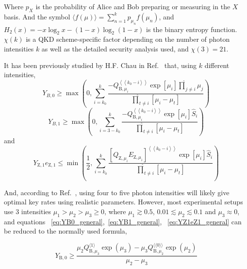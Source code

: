\documentclass[%
 reprint,
superscriptaddress,
 amsmath,amssymb,
 aps,
]{revtex4-2}
\begin{document}
Where $p_X$ is the probability of Alice and Bob preparing or measuring in the $X$ basis. And the symbol $\langle f(\mu)\rangle = \sum_{n=1}^k p_{\mu_n} f(\mu_n)$, and $H_2(x)=-x\log_2x-(1-x)\log_2(1-x)$ is the binary entropy function. $\chi(k)$ is a QKD scheme-specific factor depending on the number of photon intensities $k$ as well as the detailed security analysis used, and $\chi(3)=21$.

It has been previously studied by H.F. Chau in Ref.~\cite{Decoy_state_key_rate1} that, using $k$ different intensities,
\begin{equation}
    Y_{B, 0} \geqslant \max \left(0, \sum_{i=k_0}^k \frac{-Q_{\mathrm{B}, \mu_i}^{\left\langle\left\langle k_0-i\right\rangle\right\rangle} \exp \left[\mu_i\right] \hat{\prod}_{j \neq i} \mu_j}{\hat{\prod}_{t \neq i}\left[\mu_i-\mu_t\right]}\right)
    \label{eq:YB0_general}
\end{equation}
\begin{equation}
    Y_{B, 1} \geqslant \max \left(0, \sum_{i=3-k_0}^k \frac{-Q_{\mathrm{B}, \mu_i}^{\left\langle\left\langle k_0-i\right\rangle\right\rangle} \exp \left[\mu_i\right] \hat{S}_i}{\hat{\prod}_{t \neq i}\left[\mu_i-\mu_t\right]}\right)
    \label{eq:YB1_general}
\end{equation}
and
\begin{equation}
    Y_{\mathrm{Z}, 1} e_{\mathrm{Z}, 1} \leqslant \min \left(\frac{1}{2}, \sum_{i=k_0}^k \frac{\left[Q_{\mathrm{Z}, \mu_i} E_{\mathrm{Z}, \mu_i}\right]^{\left\langle\left\langle k_0-i\right\rangle\right\rangle} \exp \left[\mu_i\right] \hat{S}_i}{\hat{\prod}_{t \neq i}\left[\mu_i-\mu_t\right]}\right)
    \label{eq:YZ1eZ1_general}
\end{equation}

And, according to Ref.~\cite{Decoy_state_key_rate1}, using four to five photon intensities will likely give optimal key rates using realistic parameters. However, most experimental setups use 3 intensities $\mu_1>\mu_2>\mu_3\ge 0$, where $\mu_1\gtrsim0.5$, $0.01\lesssim\mu_2\lesssim0.1$ and $\mu_3\approx0$, and equations ~\ref{eq:YB0_general},~\ref{eq:YB1_general}, ~\ref{eq:YZ1eZ1_general} can be reduced to the normally used formula,

\begin{equation}
    Y_{\mathrm{B}, 0} \geqslant \frac{\mu_2 Q_{\mathrm{B}, \mu_3}^{\langle 1\rangle} \exp \left(\mu_3\right)-\mu_3 Q_{\mathrm{B}, \mu_2}^{\langle\langle 0\rangle\rangle} \exp \left(\mu_2\right)}{\mu_2-\mu_3}
\end{equation}
\end{document}
